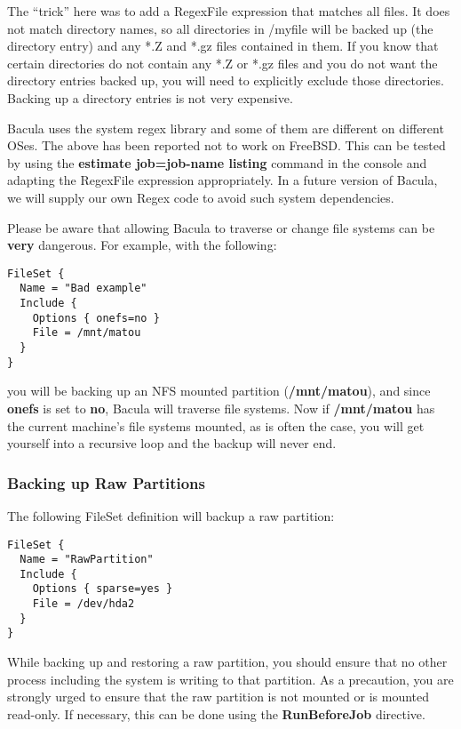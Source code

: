 The ``trick'' here was to add a RegexFile expression that matches
all files. It does not match directory names, so all directories in
/myfile will be backed up (the directory entry) and any *.Z and *.gz
files contained in them. If you know that certain directories do
not contain any *.Z or *.gz files and you do not want the directory
entries backed up, you will need to explicitly exclude those directories.
Backing up a directory entries is not very expensive.

Bacula uses the system regex library and some of them are
different on different OSes. The above has been reported not to work
on FreeBSD. This can be tested by using the {\bf estimate job=job-name
listing} command in the console and adapting the RegexFile expression
appropriately. In a future version of Bacula, we will supply our own
Regex code to avoid such system dependencies.

Please be aware that allowing Bacula to traverse or change file systems can be
{\bf very} dangerous. For example, with the following: 

\footnotesize
\begin{verbatim}
FileSet {
  Name = "Bad example"
  Include {
    Options { onefs=no }
    File = /mnt/matou
  }
}
\end{verbatim}
\normalsize

you will be backing up an NFS mounted partition ({\bf /mnt/matou}), and since
{\bf onefs} is set to {\bf no}, Bacula will traverse file systems. Now if {\bf
/mnt/matou} has the current machine's file systems mounted, as is often the
case, you will get yourself into a recursive loop and the backup will never
end. 

\subsubsection*{Backing up Raw Partitions}

The following FileSet definition will backup a raw partition: 

\footnotesize
\begin{verbatim}
FileSet {
  Name = "RawPartition"
  Include {
    Options { sparse=yes }
    File = /dev/hda2
  }
}
\end{verbatim}
\normalsize

While backing up and restoring a raw partition, you should ensure that no
other process including the system is writing to that partition. As a
precaution, you are strongly urged to ensure that the raw partition is not
mounted or is mounted read-only. If necessary, this can be done using the {\bf
RunBeforeJob} directive. 


